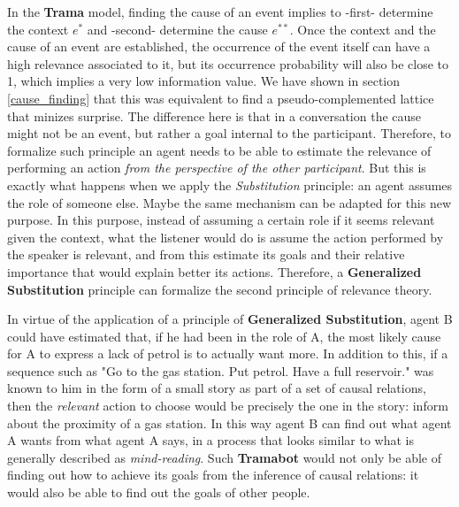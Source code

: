 \documentclass[
		twoside,openright,titlepage,numbers=noenddot,manychapters,
		headinclude,%
                footinclude=false,cleardoublepage=empty,
                BCOR=5mm,
		fontsize=11pt, %
                 enabledeprecatedfontcommands]{scrreprt}
\begin{document}
In the \textbf{Trama} model, finding the cause of an event implies to -first-  determine the context $e^*$ and -second- determine the cause $e^{**}$.  Once the context and the cause of an event are established, the occurrence of the event itself can have a high relevance associated to it, but its occurrence probability will also be close to 1, which implies a very low information value. We have shown in section \ref{cause_finding} that this was equivalent to find a pseudo-complemented lattice that minizes surprise. The difference here is that in a conversation the cause might not be an event, but rather a goal internal to the participant. Therefore, to formalize such principle an agent needs to be able to estimate the relevance of performing an action \emph{from the perspective of the other participant}. 
But this is exactly what happens when we apply the \emph{Substitution} principle: an agent assumes the role of someone else. Maybe the same mechanism can be adapted for this new purpose. In this purpose, instead of assuming a certain role if it seems relevant given the context, what the listener would do is assume the action performed by the speaker is relevant, and from this estimate its goals and their relative importance that would explain better its actions. Therefore, a \textbf{Generalized Substitution} principle can formalize the second principle of relevance theory.

In virtue of the application of a principle of \textbf{Generalized Substitution}, agent B could have estimated that, if he had been in the role of A, the most likely cause for A to express a lack of petrol is to actually want more. In addition to this, if a sequence such as "Go to the gas station. Put petrol. Have a full reservoir." was  known to him in the form of a small story as part of a set of causal relations, then the \emph{relevant} action to choose would be precisely the one in the story: inform about the proximity of a gas station. In this way agent B can find out what agent A wants from what agent A says, in a process that looks similar to what is generally described as \emph{mind-reading}.
Such \textbf{Tramabot} would not only be able of finding out how to achieve its goals from the inference of causal relations: it would also be able to find out the goals of other people. 
\end{document}
